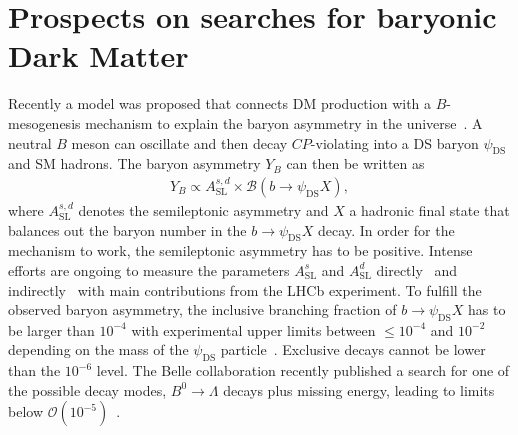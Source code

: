 \documentclass[a4paper,11pt]{article}
\begin{document}
\section{Prospects on searches for baryonic Dark Matter}
Recently a model was proposed that connects DM production with a $B$-mesogenesis mechanism to explain the baryon asymmetry in the universe~\cite{DarkBaryons1, DarkBaryons2}. A neutral $B$ meson can oscillate and then decay $C\!P$-violating into a DS baryon $\psi_{\text{DS}}$ and SM hadrons. The baryon asymmetry $Y_B$ can then be written as 
\begin{align}
Y_B\propto A^{s,d}_{\text{SL}}\times\mathcal{B}(b\to\psi_\text{DS}X),
\end{align}
where $A^{s,d}_{\text{SL}}$ denotes the semileptonic asymmetry and $X$ a hadronic final state that balances out the baryon number in the $b\to\psi_\text{DS}X$ decay.
In order for the mechanism to work, the semileptonic asymmetry has to be positive. Intense efforts are ongoing to measure the parameters $A^s_{\text{SL}}$ and $A^d_{\text{SL}}$ directly~\cite{HFLAV} and indirectly~\cite{UTFit} with main contributions from the LHCb experiment. To fulfill the observed baryon asymmetry, the inclusive branching fraction of $b\to\psi_\text{DS}X$ has to be larger than $10^{-4}$ with experimental upper limits between $\leq10^{-4}$ and $10^{-2}$ depending on the mass of the $\psi_\text{DS}$ particle~\cite{DarkBaryons2,ALEPH}. Exclusive decays cannot be lower than the $10^{-6}$ level. The Belle collaboration recently published a search for one of the possible decay modes, $B^0\to\Lambda$ decays plus missing energy, leading to limits below $\mathcal{O}(10^{-5})$~\cite{BelleBToLambda}.
\end{document}
